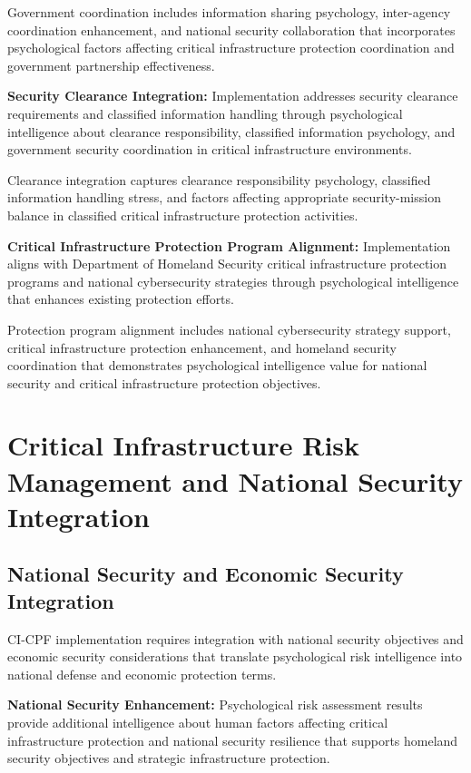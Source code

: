 \documentclass[10pt, twocolumn]{article}
\begin{document}
Government coordination includes information sharing psychology, inter-agency coordination enhancement, and national security collaboration that incorporates psychological factors affecting critical infrastructure protection coordination and government partnership effectiveness.

\textbf{Security Clearance Integration:} Implementation addresses security clearance requirements and classified information handling through psychological intelligence about clearance responsibility, classified information psychology, and government security coordination in critical infrastructure environments.

Clearance integration captures clearance responsibility psychology, classified information handling stress, and factors affecting appropriate security-mission balance in classified critical infrastructure protection activities.

\textbf{Critical Infrastructure Protection Program Alignment:} Implementation aligns with Department of Homeland Security critical infrastructure protection programs and national cybersecurity strategies through psychological intelligence that enhances existing protection efforts.

Protection program alignment includes national cybersecurity strategy support, critical infrastructure protection enhancement, and homeland security coordination that demonstrates psychological intelligence value for national security and critical infrastructure protection objectives.

\section{Critical Infrastructure Risk Management and National Security Integration}

\subsection{National Security and Economic Security Integration}

CI-CPF implementation requires integration with national security objectives and economic security considerations that translate psychological risk intelligence into national defense and economic protection terms.

\textbf{National Security Enhancement:} Psychological risk assessment results provide additional intelligence about human factors affecting critical infrastructure protection and national security resilience that supports homeland security objectives and strategic infrastructure protection.
\end{document}
